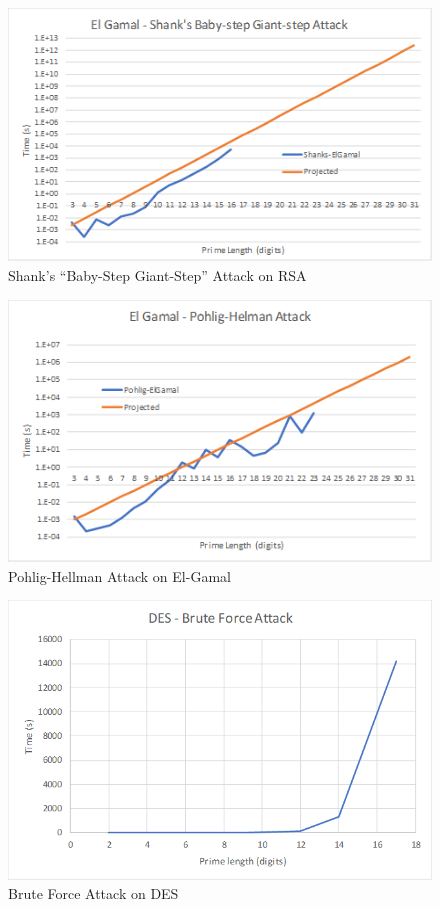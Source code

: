 \documentclass[12pt]{report}
\begin{document}
\begin{figure}[hp!] %
    \begin{center}
        \includegraphics[width=0.85\linewidth]{ElGamalShanks.PNG}
        \caption{Shank's ``Baby-Step Giant-Step'' Attack on RSA}
        \label{fig:el-gamal2}
    \end{center}
\end{figure}

\begin{figure}[hp!] %
    \begin{center}
        \includegraphics[width=0.85\linewidth]{ElGamalPohlig.PNG}
        \caption{Pohlig-Hellman Attack on El-Gamal}
        \label{fig:el-gamal3}
    \end{center}
\end{figure}

\begin{figure}[hp!] %
    \begin{center}
        \includegraphics[width=0.85\linewidth]{DES.png}
        \caption{Brute Force Attack on DES}
        \label{fig:des}
    \end{center}
\end{figure}
\end{document}
